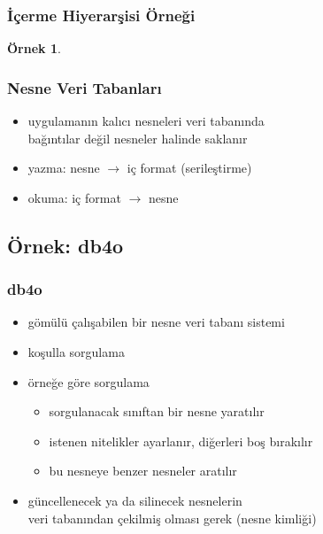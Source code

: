 \documentclass[dvipsnames]{beamer}
\theoremstyle{definition}
\theoremstyle{example}
\newtheorem{ornek}[theorem]{Örnek}
\theoremstyle{plain}
\begin{document}
\begin{frame}
  \frametitle{İçerme Hiyerarşisi Örneği}

  \begin{ornek}
    \begin{center}
    \end{center}
  \end{ornek}
\end{frame}

\begin{frame}
  \frametitle{Nesne Veri Tabanları}

  \begin{itemize}
    \item uygulamanın kalıcı nesneleri veri tabanında\\
      bağıntılar değil nesneler halinde saklanır

    \medskip
    \item yazma: nesne $\rightarrow$ iç format (\alert{serileştirme})
    \item okuma: iç format $\rightarrow$ nesne
  \end{itemize}
\end{frame}

\subsection{Örnek: db4o}

\begin{frame}
  \frametitle{db4o}

  \begin{itemize}
    \item gömülü çalışabilen bir nesne veri tabanı sistemi

    \pause
    \medskip
    \item koşulla sorgulama
    \item örneğe göre sorgulama
    \begin{itemize}
      \item sorgulanacak sınıftan bir nesne yaratılır
      \item istenen nitelikler ayarlanır, diğerleri boş bırakılır
      \item bu nesneye benzer nesneler aratılır
    \end{itemize}

    \pause
    \medskip
    \item güncellenecek ya da silinecek nesnelerin\\
      veri tabanından çekilmiş olması gerek (nesne kimliği)
  \end{itemize}
\end{frame}
\end{document}
